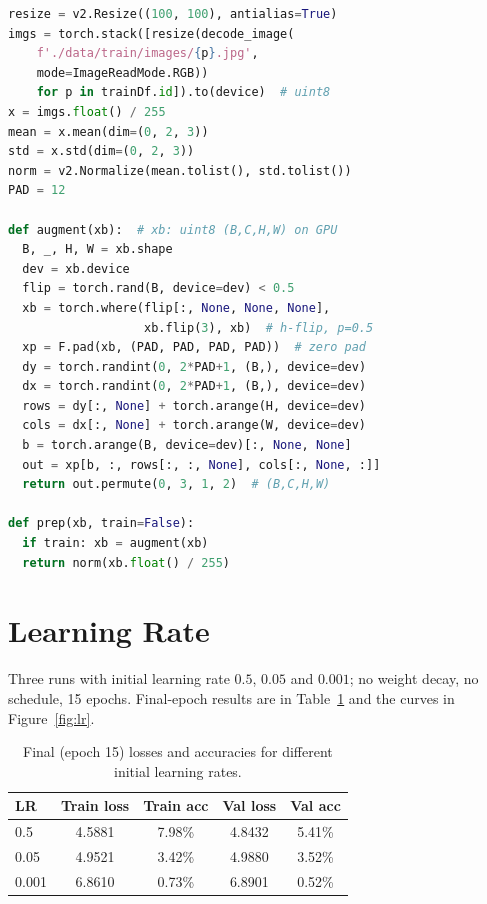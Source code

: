 \documentclass[letterpaper]{article}
\begin{document}
\begin{lstlisting}[language=Python,caption={Data preprocessing and augmentation.},label={lst:code},captionpos=b]
resize = v2.Resize((100, 100), antialias=True)
imgs = torch.stack([resize(decode_image(
    f'./data/train/images/{p}.jpg',
    mode=ImageReadMode.RGB))
    for p in trainDf.id]).to(device)  # uint8
x = imgs.float() / 255
mean = x.mean(dim=(0, 2, 3))
std = x.std(dim=(0, 2, 3))
norm = v2.Normalize(mean.tolist(), std.tolist())
PAD = 12

def augment(xb):  # xb: uint8 (B,C,H,W) on GPU
  B, _, H, W = xb.shape
  dev = xb.device
  flip = torch.rand(B, device=dev) < 0.5
  xb = torch.where(flip[:, None, None, None],
                   xb.flip(3), xb)  # h-flip, p=0.5
  xp = F.pad(xb, (PAD, PAD, PAD, PAD))  # zero pad
  dy = torch.randint(0, 2*PAD+1, (B,), device=dev)
  dx = torch.randint(0, 2*PAD+1, (B,), device=dev)
  rows = dy[:, None] + torch.arange(H, device=dev)
  cols = dx[:, None] + torch.arange(W, device=dev)
  b = torch.arange(B, device=dev)[:, None, None]
  out = xp[b, :, rows[:, :, None], cols[:, None, :]]
  return out.permute(0, 3, 1, 2)  # (B,C,H,W)

def prep(xb, train=False):
  if train: xb = augment(xb)
  return norm(xb.float() / 255)
\end{lstlisting}

\section{Learning Rate}
Three runs with initial learning rate $0.5$, $0.05$ and $0.001$; no weight decay, no schedule, 15 epochs. Final-epoch results are in Table~\ref{tab:lr} and the curves in Figure~\ref{fig:lr}.

\begin{table}[ht]
\centering
\footnotesize\setlength{\tabcolsep}{3pt}
\begin{tabular}{lcccc}
\toprule
LR & Train loss & Train acc & Val loss & Val acc\\
\midrule
0.5   & 4.5881 & 7.98\% & 4.8432 & 5.41\%\\
0.05  & 4.9521 & 3.42\% & 4.9880 & 3.52\%\\
0.001 & 6.8610 & 0.73\% & 6.8901 & 0.52\%\\
\bottomrule
\end{tabular}
\caption{Final (epoch 15) losses and accuracies for different initial learning rates.}
\label{tab:lr}
\end{table}
\end{document}
